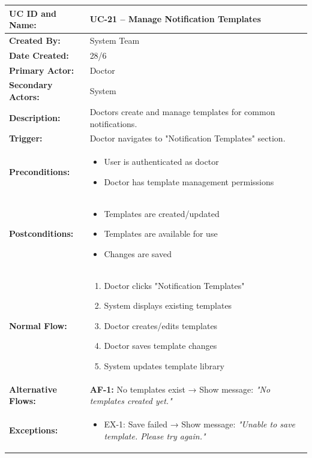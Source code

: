 \documentclass[12pt,a4paper]{article}
\begin{document}
\renewcommand{\arraystretch}{1.5}
\begin{longtable}{|p{4.5cm}|p{10.5cm}|}
\hline
\textbf{UC ID and Name:} & UC-21 – Manage Notification Templates \\
\hline
\textbf{Created By:} & System Team \\
\hline
\textbf{Date Created:} & 28/6 \\
\hline
\textbf{Primary Actor:} & Doctor \\
\hline
\textbf{Secondary Actors:} & System \\
\hline
\textbf{Description:} & Doctors create and manage templates for common notifications. \\
\hline
\textbf{Trigger:} & Doctor navigates to "Notification Templates" section. \\
\hline
\textbf{Preconditions:} &
\begin{itemize}
  \item User is authenticated as doctor
  \item Doctor has template management permissions
\end{itemize} \\
\hline
\textbf{Postconditions:} &
\begin{itemize}
  \item Templates are created/updated
  \item Templates are available for use
  \item Changes are saved
\end{itemize} \\
\hline
\textbf{Normal Flow:} &
\begin{enumerate}
  \item Doctor clicks "Notification Templates"
  \item System displays existing templates
  \item Doctor creates/edits templates
  \item Doctor saves template changes
  \item System updates template library
\end{enumerate} \\
\hline
\textbf{Alternative Flows:} &
\textbf{AF-1:} No templates exist → Show message: \textit{"No templates created yet."} \\
\hline
\textbf{Exceptions:} &
\begin{itemize}
  \item EX-1: Save failed → Show message: \textit{"Unable to save template. Please try again."}
\end{itemize} \\

\end{longtable}
\end{document}
